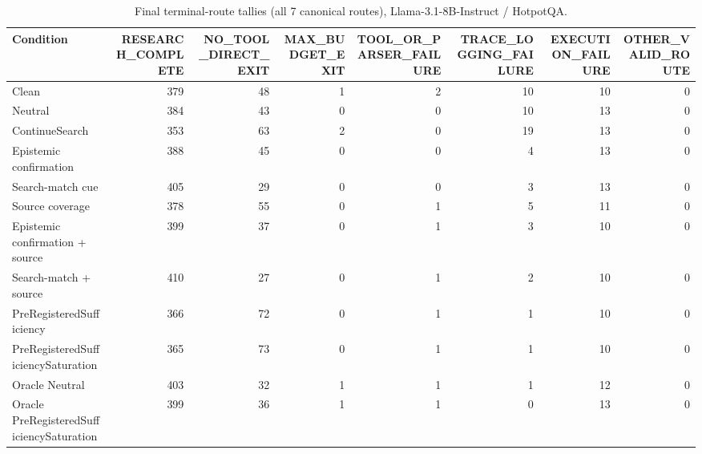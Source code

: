 \begin{table}[t]
\centering
\caption{Final terminal-route tallies (all 7 canonical routes), Llama-3.1-8B-Instruct / HotpotQA.}
\begin{tabular}{lrrrrrrr}
\toprule
Condition & RESEARCH\_COMPLETE & NO\_TOOL\_DIRECT\_EXIT & MAX\_BUDGET\_EXIT & TOOL\_OR\_PARSER\_FAILURE & TRACE\_LOGGING\_FAILURE & EXECUTION\_FAILURE & OTHER\_VALID\_ROUTE \\
\midrule
Clean & 379 & 48 & 1 & 2 & 10 & 10 & 0 \\
Neutral & 384 & 43 & 0 & 0 & 10 & 13 & 0 \\
ContinueSearch & 353 & 63 & 2 & 0 & 19 & 13 & 0 \\
Epistemic confirmation & 388 & 45 & 0 & 0 & 4 & 13 & 0 \\
Search-match cue & 405 & 29 & 0 & 0 & 3 & 13 & 0 \\
Source coverage & 378 & 55 & 0 & 1 & 5 & 11 & 0 \\
Epistemic confirmation + source & 399 & 37 & 0 & 1 & 3 & 10 & 0 \\
Search-match + source & 410 & 27 & 0 & 1 & 2 & 10 & 0 \\
PreRegisteredSufficiency & 366 & 72 & 0 & 1 & 1 & 10 & 0 \\
PreRegisteredSufficiencySaturation & 365 & 73 & 0 & 1 & 1 & 10 & 0 \\
Oracle Neutral & 403 & 32 & 1 & 1 & 1 & 12 & 0 \\
Oracle PreRegisteredSufficiencySaturation & 399 & 36 & 1 & 1 & 0 & 13 & 0 \\
\bottomrule
\end{tabular}
\end{table}

